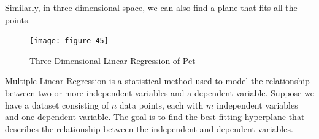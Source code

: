 \documentclass[withoutpreface,bwprint]{cumcmthesis} %
\begin{document}
\par Similarly, in three-dimensional space, we can also find a plane that fits all the points.
\begin{figure}[htbp]
	\centering
	\texttt{[image: figure\_45]}
	\caption{Three-Dimensional Linear Regression of Pet}
\end{figure}
\begin{definition}
Multiple Linear Regression is a statistical method used to model the relationship between two or more independent variables and a dependent variable. Suppose we have a dataset consisting of $n$ data points, each with $m$ independent variables and one dependent variable. The goal is to find the best-fitting hyperplane that describes the relationship between the independent and dependent variables.
\end{definition}
\end{document}
